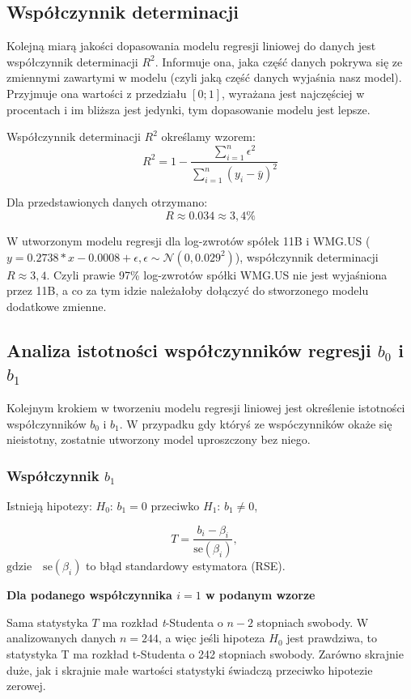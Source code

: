 \documentclass[a4paper,11pt]{article}
\begin{document}
\newpage
\subsection{Współczynnik determinacji}

Kolejną miarą jakości dopasowania modelu regresji liniowej do danych jest współczynnik determinacji \(R^2\). Informuje ona, jaka część danych pokrywa się ze zmiennymi zawartymi w modelu (czyli jaką część danych wyjaśnia nasz model). Przyjmuje ona wartości z przedziału \([0;1]\), wyrażana jest najczęściej w procentach i im bliższa jest jedynki, tym dopasowanie modelu jest lepsze.

Współczynnik determinacji \(R^2\) określamy wzorem:
\[R^2 = 1 - \frac{\sum_{i=1}^{n} \epsilon^2}{\sum_{i=1}^{n} (y_i - \bar{y})^2}\]

Dla przedstawionych danych otrzymano: 
\[R\approx0.034\approx3,4\%\]



W utworzonym modelu regresji dla log-zwrotów spółek 11B i WMG.US (\(y = 0.2738 * x - 0.0008 + \epsilon, \epsilon \sim \mathcal{N}(0, 0.029^2 )\)), współczynnik determinacji \(R\approx3,4\). Czyli prawie 97\% log-zwrotów spółki WMG.US nie jest wyjaśniona przez 11B, a co za tym idzie należałoby dołączyć do stworzonego modelu dodatkowe zmienne.

\newpage
\subsection{Analiza istotności współczynników regresji \(b_0\) i \(b_1\)}
Kolejnym krokiem w tworzeniu modelu regresji liniowej jest określenie istotności współczynników \(b_0\) i \(b_1\). W przypadku gdy któryś ze wspóczynników okaże się nieistotny, zostatnie utworzony model uproszczony bez niego.

\subsubsection{Współczynnik \(b_1\)}

Istnieją hipotezy:
\(H_0\): \(b_1=0\) przeciwko \(H_1\): \(b_1\neq0\),

\[T = \frac{b_i - \beta_i}{\text{se}(\beta_i)}, \quad 
\] \(\text{gdzie} \quad \text{se}(\beta_i)\) to błąd standardowy estymatora (RSE).

\textbf{Dla podanego współczynnika \(i=1\) w podanym wzorze}

Sama statystyka \(T\) ma rozkład  \textit{t}-Studenta o \(n-2\) stopniach swobody. W analizowanych danych \(n=244\), a więc jeśli hipoteza \(H_0\) jest prawdziwa, to statystyka T ma rozkład t-Studenta o 242 stopniach swobody. Zarówno skrajnie duże, jak i skrajnie małe wartości statystyki świadczą przeciwko hipotezie zerowej.
\end{document}

